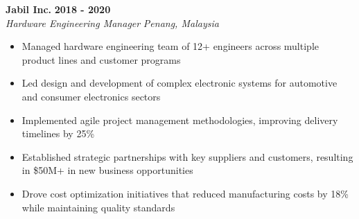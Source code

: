 \textbf{Jabil Inc.} \hfill \textbf{2018 - 2020} \\
\textit{Hardware Engineering Manager} \hfill \textit{Penang, Malaysia} \\
\vspace{-0.4mm}
\begin{itemize}[leftmargin=0.5cm, label={\textbullet}]
\item Managed hardware engineering team of 12+ engineers across multiple product lines and customer programs
\item Led design and development of complex electronic systems for automotive and consumer electronics sectors
\item Implemented agile project management methodologies, improving delivery timelines by 25\%
\item Established strategic partnerships with key suppliers and customers, resulting in \$50M+ in new business opportunities
\item Drove cost optimization initiatives that reduced manufacturing costs by 18\% while maintaining quality standards
\end{itemize}
\vspace{0.2mm}